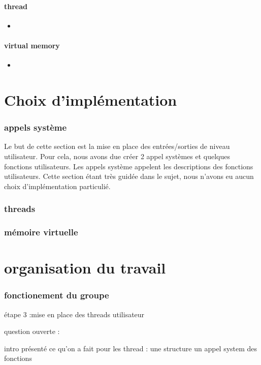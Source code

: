 \subsection{thread}
\begin{itemize}
\item 
\end{itemize}
\subsection{virtual memory}
\begin{itemize}
\item 
\end{itemize}

\part{Choix d'implémentation}
\section{appels système}
Le but de cette section est la mise en place des entrées/sorties de niveau utilisateur. Pour cela, nous avons due créer 2 appel systèmes et quelques fonctions utilisateurs. Les appels système appelent les descriptions des fonctions utilisateurs. Cette section étant très guidée dans le sujet, nous n'avons eu aucun choix d'implémentation particulié.

\section{threads}

\section{mémoire virtuelle}

\part{organisation du travail}
\section{fonctionement du groupe}

étape 3 :mise en place des threads utilisateur

question ouverte :

intro
	présenté ce qu'on a fait pour les thread :
		une structure
		un appel system
		des fonctions

